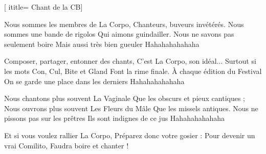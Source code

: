  [
ititle= {Chant de la CB}]


\beginverse
Nous sommes les membres de La Corpo,
Chanteurs, buveurs invétérés.
Nous sommes une bande de rigolos
Qui aimons guindailler.
Nous ne savons pas seulement boire
Mais aussi très bien gueuler
Hahahahahahaha
\endverse

\beginverse
Composer, partager, entonner des chants,
C'est La Corpo, son idéal...
Surtout si les mots Con, Cul, Bite et Gland
Font la rime finale.
À chaque édition du Festival
On se garde une place dans les derniers
Hahahahahahaha
\endverse

\beginverse
Nous chantons plus souvent La Vaginale
Que les obscurs et pieux cantiques ;
Nous ouvrons plus souvent Les Fleurs du Mâle
Que les missels antiques.
Nous ne pissons pas sur les prêtres
Ils sont indignes de ce jus
Hahahahahahaha
\endverse

\beginverse
Et si vous voulez rallier La Corpo,
Préparez donc votre gosier :
Pour devenir un vrai Comilito,
Faudra boire et chanter !
\endverse

\endsong